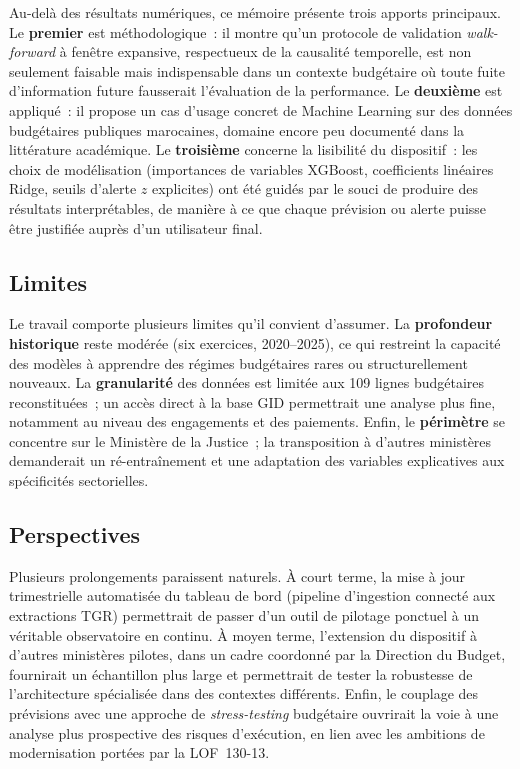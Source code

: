 \documentclass[12pt,a4paper]{article}
\begin{document}
Au-del\`a des r\'esultats num\'eriques, ce m\'emoire pr\'esente trois apports
principaux. Le \textbf{premier} est m\'ethodologique~: il montre qu'un protocole
de validation \textit{walk-forward} \`a fen\^etre expansive, respectueux de la
causalit\'e temporelle, est non seulement faisable mais indispensable dans un
contexte budg\'etaire o\`u toute fuite d'information future fausserait l'\'evaluation
de la performance. Le \textbf{deuxi\`eme} est appliqu\'e~: il propose un cas d'usage
concret de Machine Learning sur des donn\'ees budg\'etaires publiques marocaines,
domaine encore peu document\'e dans la litt\'erature acad\'emique. Le \textbf{troisi\`eme}
concerne la lisibilit\'e du dispositif~: les choix de mod\'elisation (importances
de variables XGBoost, coefficients lin\'eaires Ridge, seuils d'alerte $z$ explicites)
ont \'et\'e guid\'es par le souci de produire des r\'esultats interpr\'etables, de
mani\`ere \`a ce que chaque pr\'evision ou alerte puisse \^etre justifi\'ee aupr\`es
d'un utilisateur final.

\subsection*{Limites}

Le travail comporte plusieurs limites qu'il convient d'assumer. La \textbf{profondeur
historique} reste mod\'er\'ee (six exercices, 2020--2025), ce qui restreint la capacit\'e
des mod\`eles \`a apprendre des r\'egimes budg\'etaires rares ou structurellement
nouveaux. La \textbf{granularit\'e} des donn\'ees est limit\'ee aux 109 lignes
budg\'etaires reconstitu\'ees~; un acc\`es direct \`a la base GID permettrait une
analyse plus fine, notamment au niveau des engagements et des paiements. Enfin,
le \textbf{p\'erim\`etre} se concentre sur le Minist\`ere de la Justice~; la
transposition \`a d'autres minist\`eres demanderait un r\'e-entra\^inement et une
adaptation des variables explicatives aux sp\'ecificit\'es sectorielles.

\subsection*{Perspectives}

Plusieurs prolongements paraissent naturels. \`A court terme, la mise \`a jour
trimestrielle automatis\'ee du tableau de bord (pipeline d'ingestion connect\'e
aux extractions TGR) permettrait de passer d'un outil de pilotage ponctuel \`a un
v\'eritable observatoire en continu. \`A moyen terme, l'extension du dispositif
\`a d'autres minist\`eres pilotes, dans un cadre coordonn\'e par la Direction du
Budget, fournirait un \'echantillon plus large et permettrait de tester la
robustesse de l'architecture sp\'ecialis\'ee dans des contextes diff\'erents. Enfin,
le couplage des pr\'evisions avec une approche de \textit{stress-testing}
budg\'etaire ouvrirait la voie \`a une analyse plus prospective des risques
d'ex\'ecution, en lien avec les ambitions de modernisation port\'ees par la
LOF~130-13.
\end{document}
